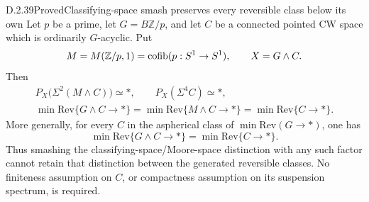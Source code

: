 \begin{claim}{D.2.39}{Proved}{Classifying-space smash preserves every reversible class below its own}
Let $p$ be a prime, let $G=B\mathbb Z/p$, and let $C$ be a
connected pointed CW space which is ordinarily $G$-acyclic.
Put
\[
       M=M(\mathbb Z/p,1)=\operatorname{cofib}(p:S^1\to S^1),
       \qquad X=G\wedge C.
\]
Then
\[
 \begin{gathered}
 P_X\bigl(\Sigma^2(M\wedge C)\bigr)\simeq *,\qquad
 P_X(\Sigma^4C)\simeq *,\\
 \min\mathrm{Rev}\{G\wedge C\to *\}
   =\min\mathrm{Rev}\{M\wedge C\to *\}
   =\min\mathrm{Rev}\{C\to *\}.
 \end{gathered}
 \tag{D.2.39a}
\]
More generally, for every $C$ in the aspherical class of
$\min\mathrm{Rev}(G\to *)$, one has
\[
 \min\mathrm{Rev}\{G\wedge C\to *\}
             =\min\mathrm{Rev}\{C\to *\}.
 \tag{D.2.39a'}
\]
Thus smashing the classifying-space/Moore-space distinction with
any such factor cannot retain that distinction between the
generated reversible classes.
No finiteness assumption on $C$, or compactness assumption on its
suspension spectrum, is required.
\end{claim}
